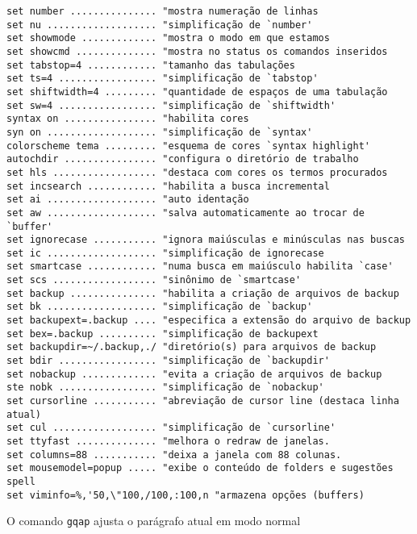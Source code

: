 \begin{verbatim}
set number ............... "mostra numeração de linhas
set nu ................... "simplificação de `number'
set showmode ............. "mostra o modo em que estamos
set showcmd .............. "mostra no status os comandos inseridos
set tabstop=4 ............ "tamanho das tabulações
set ts=4 ................. "simplificação de `tabstop'
set shiftwidth=4 ......... "quantidade de espaços de uma tabulação
set sw=4 ................. "simplificação de `shiftwidth'
syntax on ................ "habilita cores
syn on ................... "simplificação de `syntax'
colorscheme tema ......... "esquema de cores `syntax highlight'
autochdir ................ "configura o diretório de trabalho
set hls .................. "destaca com cores os termos procurados
set incsearch ............ "habilita a busca incremental
set ai ................... "auto identação
set aw ................... "salva automaticamente ao trocar de `buffer'
set ignorecase ........... "ignora maiúsculas e minúsculas nas buscas
set ic ................... "simplificação de ignorecase
set smartcase ............ "numa busca em maiúsculo habilita `case'
set scs .................. "sinônimo de `smartcase'
set backup ............... "habilita a criação de arquivos de backup
set bk ................... "simplificação de `backup'
set backupext=.backup .... "especifica a extensão do arquivo de backup
set bex=.backup .......... "simplificação de backupext
set backupdir=~/.backup,./ "diretório(s) para arquivos de backup
set bdir ................. "simplificação de `backupdir'
set nobackup ............. "evita a criação de arquivos de backup
ste nobk ................. "simplificação de `nobackup'
set cursorline ........... "abreviação de cursor line (destaca linha atual)
set cul .................. "simplificação de `cursorline'
set ttyfast .............. "melhora o redraw de janelas.
set columns=88 ........... "deixa a janela com 88 colunas.
set mousemodel=popup ..... "exibe o conteúdo de folders e sugestões spell
set viminfo=%,'50,\"100,/100,:100,n "armazena opções (buffers)
\end{verbatim}

O comando \verb|gqap| ajusta o parágrafo atual em modo normal

